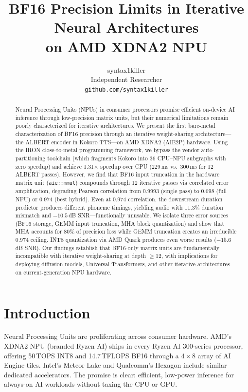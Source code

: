 \documentclass[11pt]{article}
\title{\textbf{BF16 Precision Limits in Iterative Neural Architectures\\on AMD XDNA2 NPU}}
\author{
    syntax1killer \\
    Independent Researcher \\
    \texttt{github.com/syntax1killer}
}
\date{}
\begin{document}
\maketitle

\begin{abstract}
Neural Processing Units (NPUs) in consumer processors promise efficient on-device AI inference through low-precision matrix units, but their numerical limitations remain poorly characterized for iterative architectures. We present the first bare-metal characterization of BF16 precision through an iterative weight-sharing architecture---the ALBERT encoder in Kokoro TTS---on AMD XDNA2 (AIE2P) hardware. Using the IRON close-to-metal programming framework, we bypass the vendor auto-partitioning toolchain (which fragments Kokoro into 36 CPU--NPU subgraphs with zero speedup) and achieve 1.31$\times$ speedup over CPU (229\,ms vs.\ 300\,ms for 12 ALBERT passes). However, we find that BF16 input truncation in the hardware matrix unit (\texttt{aie::mmul}) compounds through 12 iterative passes via correlated error amplification, degrading Pearson correlation from 0.9993 (single pass) to 0.698 (full NPU) or 0.974 (best hybrid). Even at 0.974 correlation, the downstream duration predictor produces different phoneme timings, yielding audio with 11.3\% duration mismatch and $-10.5$\,dB SNR---functionally unusable. We isolate three error sources (BF16 storage, GEMM input truncation, MHA block quantization) and show that MHA accounts for 80\% of precision loss while GEMM truncation creates an irreducible 0.974 ceiling. INT8 quantization via AMD Quark produces even worse results ($-15.6$\,dB SNR). Our findings establish that BF16-only matrix units are fundamentally incompatible with iterative weight-sharing at depth $\geq$12, with implications for deploying diffusion models, Universal Transformers, and other iterative architectures on current-generation NPU hardware.
\end{abstract}

\section{Introduction}

Neural Processing Units are proliferating across consumer hardware. AMD's XDNA2 NPU (branded Ryzen AI) ships in every Ryzen AI 300-series processor, offering 50\,TOPS INT8 and 14.7\,TFLOPS BF16 through a $4\times8$ array of AI Engine tiles. Intel's Meteor Lake and Qualcomm's Hexagon include similar dedicated accelerators. The promise is clear: efficient, low-power inference for always-on AI workloads without taxing the CPU or GPU.
\end{document}
